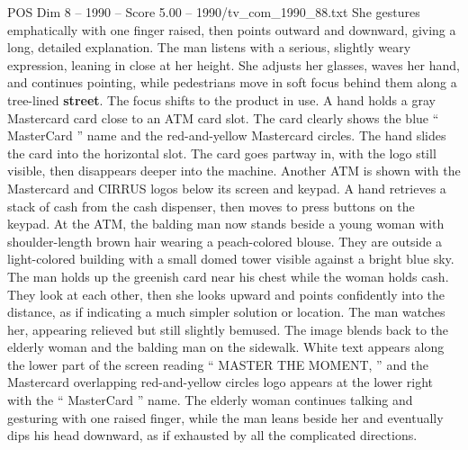 \begin{textsample}{POS Dim 8 – 1990 – Score 5.00 – 1990/tv\_com\_1990\_88.txt}
She gestures emphatically with one finger raised, then points outward and downward, giving a long, detailed explanation.
The man listens with a serious, slightly weary expression, leaning in close at her height.
She adjusts her glasses, waves her hand, and continues pointing, while pedestrians move in soft focus behind them along a tree-lined \textbf{street}.
The focus shifts to the product in use.
A hand holds a gray Mastercard card close to an ATM card slot.
The card clearly shows the blue “ MasterCard ” name and the red-and-yellow Mastercard circles.
The hand slides the card into the horizontal slot.
The card goes partway in, with the logo still visible, then disappears deeper into the machine.
Another ATM is shown with the Mastercard and CIRRUS logos below its screen and keypad.
A hand retrieves a stack of cash from the cash dispenser, then moves to press buttons on the keypad.
At the ATM, the balding man now stands beside a young woman with shoulder-length brown hair wearing a peach-colored blouse.
They are outside a light-colored building with a small domed tower visible against a bright blue sky.
The man holds up the greenish card near his chest while the woman holds cash.
They look at each other, then she looks upward and points confidently into the distance, as if indicating a much simpler solution or location.
The man watches her, appearing relieved but still slightly bemused.
The image blends back to the elderly woman and the balding man on the sidewalk.
White text appears along the lower part of the screen reading “ MASTER THE MOMENT, ” and the Mastercard overlapping red-and-yellow circles logo appears at the lower right with the “ MasterCard ” name.
The elderly woman continues talking and gesturing with one raised finger, while the man leans beside her and eventually dips his head downward, as if exhausted by all the complicated directions.

\end{textsample}
